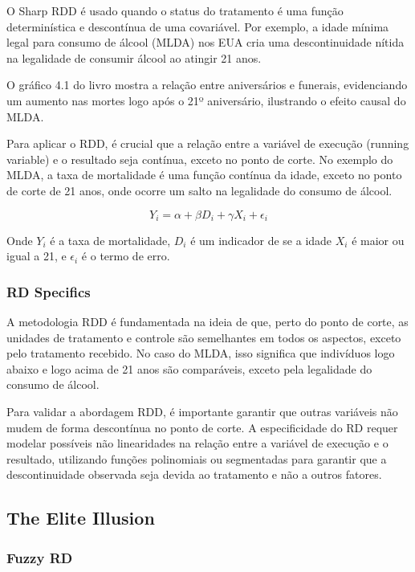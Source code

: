 \documentclass[a4paper,12pt]{article}[abntex2]
\begin{document}
O Sharp RDD é usado quando o status do tratamento é uma função determinística e descontínua de uma covariável. Por exemplo, a idade mínima legal para consumo de álcool (MLDA) nos EUA cria uma descontinuidade nítida na legalidade de consumir álcool ao atingir 21 anos. 

O gráfico 4.1 do livro mostra a relação entre aniversários e funerais, evidenciando um aumento nas mortes logo após o 21º aniversário, ilustrando o efeito causal do MLDA.

Para aplicar o RDD, é crucial que a relação entre a variável de execução (running variable) e o resultado seja contínua, exceto no ponto de corte. No exemplo do MLDA, a taxa de mortalidade é uma função contínua da idade, exceto no ponto de corte de 21 anos, onde ocorre um salto na legalidade do consumo de álcool.

\begin{equation}
    Y_i = \alpha + \beta D_i + \gamma X_i + \epsilon_i
\end{equation}

Onde \(Y_i\) é a taxa de mortalidade, \(D_i\) é um indicador de se a idade \(X_i\) é maior ou igual a 21, e \(\epsilon_i\) é o termo de erro.

\subsubsection*{RD Specifics}

A metodologia RDD é fundamentada na ideia de que, perto do ponto de corte, as unidades de tratamento e controle são semelhantes em todos os aspectos, exceto pelo tratamento recebido. No caso do MLDA, isso significa que indivíduos logo abaixo e logo acima de 21 anos são comparáveis, exceto pela legalidade do consumo de álcool.

Para validar a abordagem RDD, é importante garantir que outras variáveis não mudem de forma descontínua no ponto de corte. A especificidade do RD requer modelar possíveis não linearidades na relação entre a variável de execução e o resultado, utilizando funções polinomiais ou segmentadas para garantir que a descontinuidade observada seja devida ao tratamento e não a outros fatores.

\subsection{The Elite Illusion}

\subsubsection*{Fuzzy RD}
\end{document}

